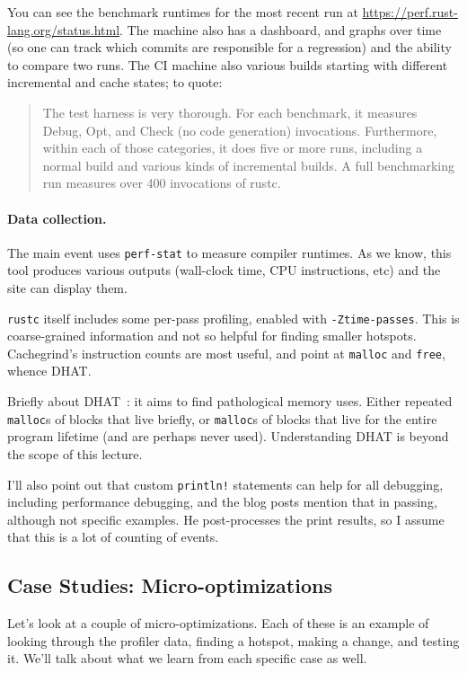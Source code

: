 You can see the benchmark runtimes for the most recent run at \url{https://perf.rust-lang.org/status.html}.
The machine also has a dashboard, and graphs over time (so one can track which commits are responsible for a regression) and the
ability to compare two runs. The CI machine also various builds starting with different incremental and cache states; to quote:
\begin{quote}
The test harness is very thorough. For each benchmark, it measures Debug, Opt, and Check (no code generation) invocations. Furthermore, within each of those categories, it does five or more runs, including a normal build and various kinds of incremental builds. A full benchmarking run measures over 400 invocations of rustc.
\end{quote}

\paragraph{Data collection.} The main event uses \texttt{perf-stat} to measure compiler runtimes.
As we know, this tool produces various outputs (wall-clock time, CPU
instructions, etc) and the site can display them.


\texttt{rustc} itself includes some per-pass profiling, enabled with \texttt{-Ztime-passes}. This is
coarse-grained information and not so helpful for finding smaller hotspots. Cachegrind's instruction
counts are most useful, and point at \texttt{malloc} and \texttt{free}, whence DHAT.

Briefly about DHAT~\cite{seward10:_fun_dhat}: it aims to find
pathological memory uses.  Either repeated \texttt{malloc}s of blocks
that live briefly, or \texttt{malloc}s of blocks that live for the
entire program lifetime (and are perhaps never used). Understanding
DHAT is beyond the scope of this lecture.

I'll also point out that custom \texttt{println!} statements can help for all debugging, including
performance debugging, and the blog posts mention that in passing, although not specific examples.
He post-processes the print results, so I assume that this is a lot of counting of events.

\subsection*{Case Studies: Micro-optimizations}
Let's look at a couple of micro-optimizations. Each of these is an example of looking through
the profiler data, finding a hotspot, making a change, and testing it. We'll talk
about what we learn from each specific case as well.


